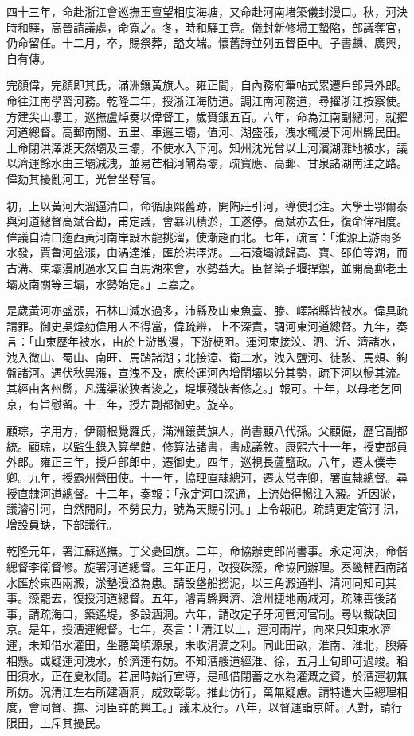 \begin{pinyinscope}
四十三年，命赴浙江會巡撫王亶望相度海塘，又命赴河南堵築儀封漫口。秋，河決時和驛，高晉請議處，命寬之。冬，時和驛工竟。儀封新修埽工蟄陷，部議奪官，仍命留任。十二月，卒，賜祭葬，謚文端。懷舊詩並列五督臣中。子書麟、廣興，自有傳。

完顏偉，完顏即其氏，滿洲鑲黃旗人。雍正間，自內務府筆帖式累遷戶部員外郎。命往江南學習河務。乾隆二年，授浙江海防道。調江南河務道，尋擢浙江按察使。方建尖山壩工，巡撫盧焯奏以偉督工，歲賚銀五百。六年，命為江南副總河，就擢河道總督。高郵南關、五里、車邏三壩，值河、湖盛漲，洩水輒浸下河州縣民田。上命閉洪澤湖天然壩及三壩，不使水入下河。知州沈光曾以上河濱湖灘地被水，議以濟運餘水由三壩減洩，並易芒稻河閘為壩，疏寶應、高郵、甘泉諸湖南注之路。偉劾其擾亂河工，光曾坐奪官。

初，上以黃河大溜逼清口，命循康熙舊跡，開陶莊引河，導使北注。大學士鄂爾泰與河道總督高斌合勘，甫定議，會暴汛積淤，工遂停。高斌亦去任，復命偉相度。偉議自清口迤西黃河南岸設木龍挑溜，使漸趨而北。七年，疏言：「淮源上游雨多水發，賈魯河盛漲，由渦達淮，匯於洪澤湖。三石滾壩減歸高、寶、邵伯等湖，而古溝、東壩漫刷過水又自白馬湖來會，水勢益大。臣督築子堰捍禦，並開高郵老土壩及南關等三壩，水勢始定。」上嘉之。

是歲黃河亦盛漲，石林口減水過多，沛縣及山東魚臺、滕、嶧諸縣皆被水。偉具疏請罪。御史吳煒劾偉用人不得當，偉疏辨，上不深責，調河東河道總督。九年，奏言：「山東歷年被水，由於上游散漫，下游梗阻。運河東接汶、泗、沂、濟諸水，洩入微山、蜀山、南旺、馬踏諸湖；北接漳、衛二水，洩入鹽河、徒駭、馬頰、鉤盤諸河。遇伏秋異漲，宣洩不及，應於運河內增閘壩以分其勢，疏下河以暢其流。其經由各州縣，凡溝渠淤狹者浚之，堤堰殘缺者修之。」報可。十年，以母老乞回京，有旨慰留。十三年，授左副都御史。旋卒。

顧琮，字用方，伊爾根覺羅氏，滿洲鑲黃旗人，尚書顧八代孫。父顧儼，歷官副都統。顧琮，以監生錄入算學館，修算法諸書，書成議敘。康熙六十一年，授吏部員外郎。雍正三年，授戶部郎中，遷御史。四年，巡視長蘆鹽政。八年，遷太僕寺卿。九年，授霸州營田使。十一年，協理直隸總河，遷太常寺卿，署直隸總督。尋授直隸河道總督。十二年，奏報：「永定河口深通，上流始得暢注入澱。近因淤，議濬引河，自然開刷，不勞民力，號為天賜引河。」上令報祀。疏請更定管河汛，增設員缺，下部議行。

乾隆元年，署江蘇巡撫。丁父憂回旗。二年，命協辦吏部尚書事。永定河決，命偕總督李衛督修。旋署河道總督。三年正月，改授硃藻，命協同辦理。奏畿輔西南諸水匯於東西兩澱，淤墊漫溢為患。請設垡船撈泥，以三角澱通判、清河同知司其事。藻罷去，復授河道總督。五年，濬青縣興濟、滄州捷地兩減河，疏陳善後諸事，請疏海口，築遙堤，多設涵洞。六年，請改定子牙河管河官制。尋以裁缺回京。是年，授漕運總督。七年，奏言：「清江以上，運河兩岸，向來只知束水濟運，未知借水灌田，坐聽萬頃源泉，未收涓滴之利。同此田畝，淮南、淮北，腴瘠相懸。或疑運河洩水，於濟運有妨。不知漕艘道經淮、徐，五月上旬即可過竣。稻田須水，正在夏秋間。若屆時始行宣導，是祗借閉蓄之水為灌溉之資，於漕運初無所妨。況清江左右所建涵洞，成效彰彰。推此仿行，萬無疑慮。請特遣大臣總理相度，會同督、撫、河臣詳酌興工。」議未及行。八年，以督運詣京師。入對，請行限田，上斥其擾民。


\end{pinyinscope}
